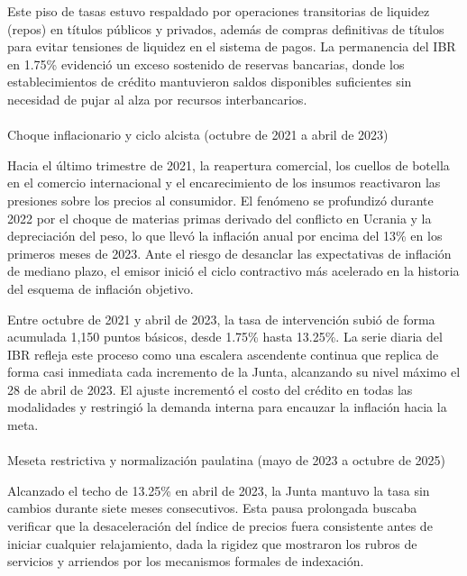 \documentclass[
  10pt,
  letterpaper,
  DIV=11,
  numbers=noendperiod]{scrartcl}
\makeatletter
\let\oldparagraph\paragraph
\renewcommand{\paragraph}{
    \@ifstar
      \xxxParagraphStar
      \xxxParagraphNoStar
  }
\newcommand{\xxxParagraphStar}[1]{\oldparagraph*{#1}\mbox{}}
\newcommand{\xxxParagraphNoStar}[1]{\oldparagraph{#1}\mbox{}}
\makeatother
\begin{document}
Este piso de tasas estuvo respaldado por operaciones transitorias de
liquidez (repos) en títulos públicos y privados, además de compras
definitivas de títulos para evitar tensiones de liquidez en el sistema
de pagos. La permanencia del IBR en 1.75\% evidenció un exceso sostenido
de reservas bancarias, donde los establecimientos de crédito mantuvieron
saldos disponibles suficientes sin necesidad de pujar al alza por
recursos interbancarios.

\paragraph{Choque inflacionario y ciclo alcista (octubre de 2021 a abril
de
2023)}\label{choque-inflacionario-y-ciclo-alcista-octubre-de-2021-a-abril-de-2023}

Hacia el último trimestre de 2021, la reapertura comercial, los cuellos
de botella en el comercio internacional y el encarecimiento de los
insumos reactivaron las presiones sobre los precios al consumidor. El
fenómeno se profundizó durante 2022 por el choque de materias primas
derivado del conflicto en Ucrania y la depreciación del peso, lo que
llevó la inflación anual por encima del 13\% en los primeros meses de
2023. Ante el riesgo de desanclar las expectativas de inflación de
mediano plazo, el emisor inició el ciclo contractivo más acelerado en la
historia del esquema de inflación objetivo.

Entre octubre de 2021 y abril de 2023, la tasa de intervención subió de
forma acumulada 1,150 puntos básicos, desde 1.75\% hasta 13.25\%. La
serie diaria del IBR refleja este proceso como una escalera ascendente
continua que replica de forma casi inmediata cada incremento de la
Junta, alcanzando su nivel máximo el 28 de abril de 2023. El ajuste
incrementó el costo del crédito en todas las modalidades y restringió la
demanda interna para encauzar la inflación hacia la meta.

\paragraph{Meseta restrictiva y normalización paulatina (mayo de 2023 a
octubre de
2025)}\label{meseta-restrictiva-y-normalizaciuxf3n-paulatina-mayo-de-2023-a-octubre-de-2025}

Alcanzado el techo de 13.25\% en abril de 2023, la Junta mantuvo la tasa
sin cambios durante siete meses consecutivos. Esta pausa prolongada
buscaba verificar que la desaceleración del índice de precios fuera
consistente antes de iniciar cualquier relajamiento, dada la rigidez que
mostraron los rubros de servicios y arriendos por los mecanismos
formales de indexación.
\end{document}

